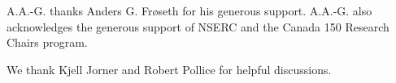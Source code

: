 A.A.-G. thanks Anders G. Fr{\o}seth for his generous support.
A.A.-G. also acknowledges the generous support of NSERC and the Canada 150 Research Chairs program.

We thank Kjell Jorner and Robert Pollice for helpful discussions.
